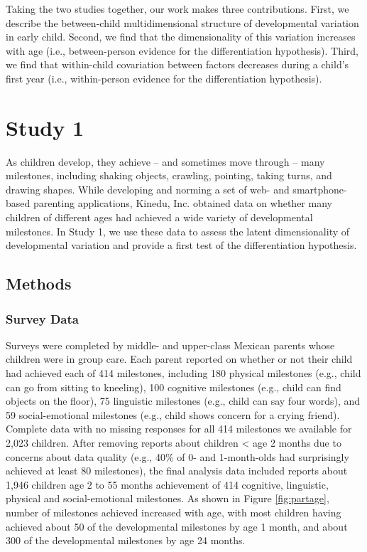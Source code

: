 \documentclass[man, floatsintext]{apa7}
\begin{document}
Taking the two studies together, our work makes three contributions.
First, we describe the between-child multidimensional structure of
developmental variation in early child. Second, we find that the
dimensionality of this variation increases with age (i.e., between-person evidence for the differentiation hypothesis). Third, we find that
within-child covariation between factors decreases during a child's
first year (i.e., within-person evidence for the differentiation hypothesis).

\section{Study 1}

As children develop, they achieve -- and sometimes move through -- many milestones,
including shaking objects, crawling, pointing, taking turns, and drawing
shapes. While developing and norming a set of web- and smartphone-based
parenting applications, Kinedu, Inc. obtained data on whether many
children of different ages had achieved a wide variety of developmental milestones. In Study 1, we use these data to assess the latent dimensionality of developmental variation and provide a first test of the differentiation hypothesis.

\subsection{Methods}

\subsubsection{Survey Data}

Surveys were completed by
middle- and upper-class Mexican parents whose children were in group
care. Each parent reported on whether or not
their child had achieved each of 414 milestones, including 180
physical milestones (e.g., child can go from sitting to kneeling), 100
cognitive milestones (e.g., child can find objects on the floor), 75
linguistic milestones (e.g., child can say four words), and 59
social-emotional milestones (e.g., child shows concern for a crying
friend). Complete data with no missing responses for all 414 milestones we available for 2,023 children. After removing reports about children < age 2 months due to concerns about data quality (e.g., 40\% of 0- and 1-month-olds had surprisingly achieved at least 80
milestones), the final analysis data included reports about 1,946 children age 2 to 55
months achievement of 414 cognitive, linguistic, physical and
social-emotional milestones. As shown in Figure \ref{fig:partage}, number of milestones achieved increased with age, with most
children having achieved about 50 of the developmental milestones by age 1 month, and about 300 of the developmental milestones by age 24 months. 
\end{document}
